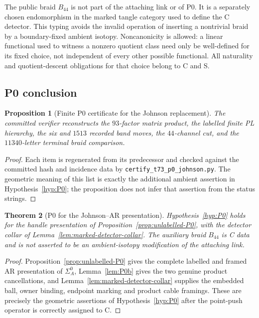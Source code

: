 \documentclass[11pt]{amsart}
\newtheorem{theorem}{Theorem}[section]
\newtheorem{proposition}[theorem]{Proposition}
\theoremstyle{definition}
\theoremstyle{remark}
\begin{document}
The public braid $B_{44}$ is not part of the attaching link or of P0.  It is a
separately chosen endomorphism in the marked tangle category used to define the
C detector.  This typing avoids the invalid operation of inserting a
nontrivial braid by a boundary-fixed ambient isotopy.  Noncanonicity is allowed:
a linear functional used to witness a nonzero quotient class need only be
well-defined for its fixed choice, not independent of every other possible
functional.  All naturality and quotient-descent obligations for that choice
belong to C and S.

\subsection{P0 conclusion}\label{sec:p0-conclusion}

\begin{proposition}[Finite P0 certificate for the Johnson replacement]\label{prop:P0finite}
The committed verifier reconstructs the $93$-factor matrix product, the
labelled finite PL hierarchy, the six and $1513$ recorded band moves, the
$44$-channel cut, and the $11340$-letter terminal braid comparison.
\end{proposition}

\begin{proof}
Each item is regenerated from its predecessor and checked against the
committed hash and incidence data by
\texttt{certify\_t73\_p0\_johnson.py}.  The geometric meaning of this list is
exactly the additional ambient assertion in Hypothesis~\ref{hyp:P0}; the
proposition does not infer that assertion from the status strings.
\end{proof}

\begin{theorem}[P0 for the Johnson--AR presentation]\label{thm:P0discharge}
Hypothesis~\ref{hyp:P0} holds for the handle presentation of
Proposition~\ref{prop:unlabelled-P0}, with the detector collar of
Lemma~\ref{lem:marked-detector-collar}.  The auxiliary braid $B_{44}$ is C
data and is not asserted to be an ambient-isotopy modification of the
attaching link.
\end{theorem}

\begin{proof}
Proposition~\ref{prop:unlabelled-P0} gives the complete labelled and framed AR
presentation of $\Sigma_A^0$, Lemma~\ref{lem:P0b} gives the two genuine
product cancellations, and Lemma~\ref{lem:marked-detector-collar} supplies the
embedded ball, owner binding, endpoint marking and product cable framings.
These are precisely the geometric assertions of Hypothesis~\ref{hyp:P0} after
the point-push operator is correctly assigned to C.
\end{proof}
\end{document}
